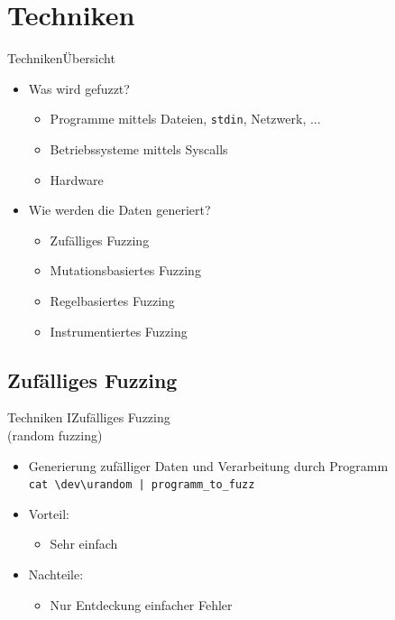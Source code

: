 \documentclass[ngerman,aspectratio=1610,12pt]{beamer}
\begin{document}
\section{Techniken}
\begin{frame}{Techniken}{Übersicht\\}
  \begin{itemize}
    \item Was wird gefuzzt?
    \begin{itemize}
      \item Programme mittels Dateien, \texttt{stdin}, Netzwerk, ...
      \item Betriebssysteme mittels Syscalls
      \item Hardware
    \end{itemize}
  
    \item Wie werden die Daten generiert?
    \begin{itemize}
      \item Zufälliges Fuzzing
      \item Mutationsbasiertes Fuzzing
      \item Regelbasiertes Fuzzing
      \item Instrumentiertes Fuzzing
    \end{itemize}
  \end{itemize}    
\end{frame}

\subsection*{Zufälliges Fuzzing}
\begin{frame}{Techniken I}{Zufälliges Fuzzing \\{\large (random fuzzing)}}
  \begin{itemize}
    \item Generierung zufälliger Daten und Verarbeitung durch Programm \\\texttt{cat \textbackslash dev\textbackslash urandom |  programm\_to\_fuzz}
    \item Vorteil: 
    \begin{itemize}
      \item Sehr einfach
    \end{itemize}
    \item Nachteile: 
    \begin{itemize}
      \item Nur Entdeckung einfacher Fehler
    \end{itemize}
  \end{itemize}
\end{frame}
\end{document}
